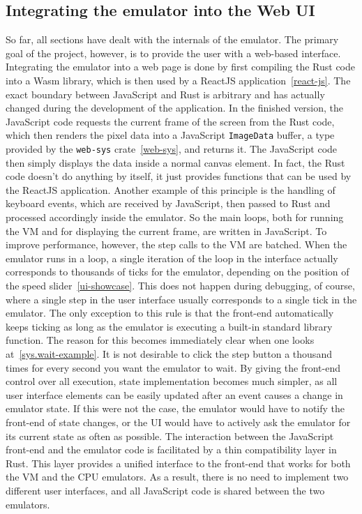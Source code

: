 \subsection{Integrating the emulator into the Web UI}
So far, all sections have dealt with the internals of the emulator.
The primary goal of the project, however, is to provide the user with a web-based interface.
Integrating the emulator into a web page is done by first compiling the Rust code into a Wasm library, which is then used by a ReactJS application~\ref{react-js}.
The exact boundary between JavaScript and Rust is arbitrary and has actually changed during the development of the application.
In the finished version, the JavaScript code requests the current frame of the screen from the Rust code, which then renders the pixel data into a JavaScript \verb+ImageData+ buffer, a type provided by the \verb+web-sys+ crate~\ref{web-sys}, and returns it.
The JavaScript code then simply displays the data inside a normal canvas element.
In fact, the Rust code doesn't do anything by itself, it just provides functions that can be used by the ReactJS application.
Another example of this principle is the handling of keyboard events, which are received by JavaScript, then passed to Rust and processed accordingly inside the emulator.
So the main loops, both for running the VM and for displaying the current frame, are written in JavaScript.
To improve performance, however, the step calls to the VM are batched.
When the emulator runs in a loop, a single iteration of the loop in the interface actually corresponds to thousands of ticks for the emulator, depending on the position of the speed slider~\ref{ui-showcase}.
This does not happen during debugging, of course, where a single step in the user interface usually corresponds to a single tick in the emulator.
The only exception to this rule is that the front-end automatically keeps ticking as long as the emulator is executing a built-in standard library function.
The reason for this becomes immediately clear when one looks at~\cref{sys.wait-example}.
It is not desirable to click the step button a thousand times for every second you want the emulator to wait.
By giving the front-end control over all execution, state implementation becomes much simpler, as all user interface elements can be easily updated after an event causes a change in emulator state.
If this were not the case, the emulator would have to notify the front-end of state changes, or the UI would have to actively ask the emulator for its current state as often as possible.
The interaction between the JavaScript front-end and the emulator code is facilitated by a thin compatibility layer in Rust.
This layer provides a unified interface to the front-end that works for both the VM and the CPU emulators.
As a result, there is no need to implement two different user interfaces, and all JavaScript code is shared between the two emulators.

